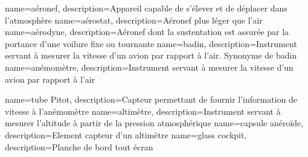 {
    name=aéronef,
    description={Appareil capable de s'élever et de déplacer dans l'atmosphère}
}
{
    name=aérostat,
    description={Aéronef plus léger que l'air}
}
{
    name=aérodyne,
    description={Aéronef dont la sustentation est assurée par la portance d'une voilure fixe ou tournante}
}
{
    name=badin,
    description={Instrument servant à mesurer la vitesse d'un avion par rapport à l'air. Synonyme de badin}
}
{
    name=anémomètre,
    description={Instrument servant à mesurer la vitesse d'un avion par rapport à l'air}
}

{
    name=tube Pitot,
    description={Capteur permettant de fournir l'information de vitesse à l'anémomètre}
}
{
    name=altimètre,
    description={Instrument servant à mesurer l'altitude à partir de la pression atmosphérique}
}
{
    name=capsule anéroïde,
    description={Element capteur d'un altimètre}
}
{
    name=glass cockpit,
    description={Planche de bord tout écran}
}





